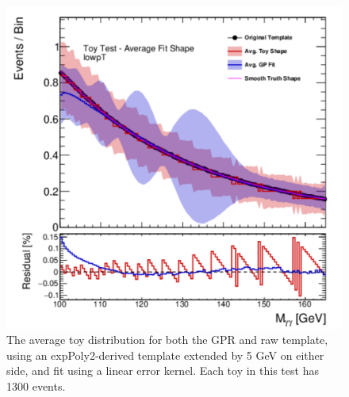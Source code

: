 \begin{figure} 
\begin{center}
  \includegraphics[width=\textwidth]{figures/background/gpr/validation/linear/ToyTest_AvgFitShape_lowpT_1300_noSig}   
\caption{The average toy distribution for both the GPR and raw template, using an expPoly2-derived template extended by 5 GeV on either side, and fit using a linear error kernel. Each toy in this test has 1300 events.}
\label{fig:linearkernel_lowpt_1300_noSig}
\end{center}
\end{figure}

